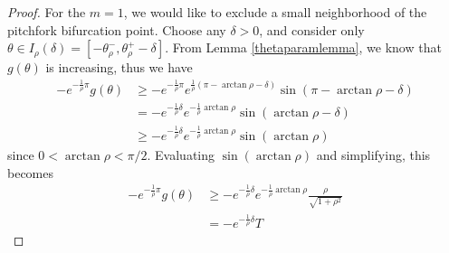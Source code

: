 \documentclass[thesis.tex]{subfiles}
\begin{document}
\begin{lemma}
\begin{proof}
For the $m = 1$, we would like to exclude a small neighborhood of the pitchfork bifurcation point. Choose any $\delta > 0$, and consider only $\theta \in I_\rho(\delta) = [-\theta_\rho^-, \theta_\rho^+ - \delta]$. From Lemma \ref{thetaparamlemma}, we know that $g(\theta)$ is increasing, thus we have
\begin{align*}
-e^{ -\frac{1}{\rho} \pi } g(\theta) &\geq 
 -e^{ -\frac{1}{\rho} \pi } e^{ \frac{1}{\rho}(\pi - \arctan \rho - \delta) } \sin(\pi - \arctan \rho - \delta) \\
&= -e^{-\frac{1}{\rho}\delta} e^{-\frac{1}{\rho}\arctan\rho}\sin(\arctan \rho - \delta) \\
&\geq -e^{-\frac{1}{\rho}\delta} e^{-\frac{1}{\rho}\arctan\rho}\sin(\arctan \rho)
\end{align*}
since $0 < \arctan \rho < \pi/2$. Evaluating $\sin(\arctan\rho)$ and simplifying, this becomes
\begin{align*}
-e^{ -\frac{1}{\rho} \pi } g(\theta)
&\geq -e^{-\frac{1}{\rho}\delta} e^{-\frac{1}{\rho}\arctan\rho}\frac{\rho}{\sqrt{1 + \rho^2}} \\
&= -e^{-\frac{1}{\rho}\delta} T
\end{align*}


\end{proof}
\end{lemma}
\end{document}
